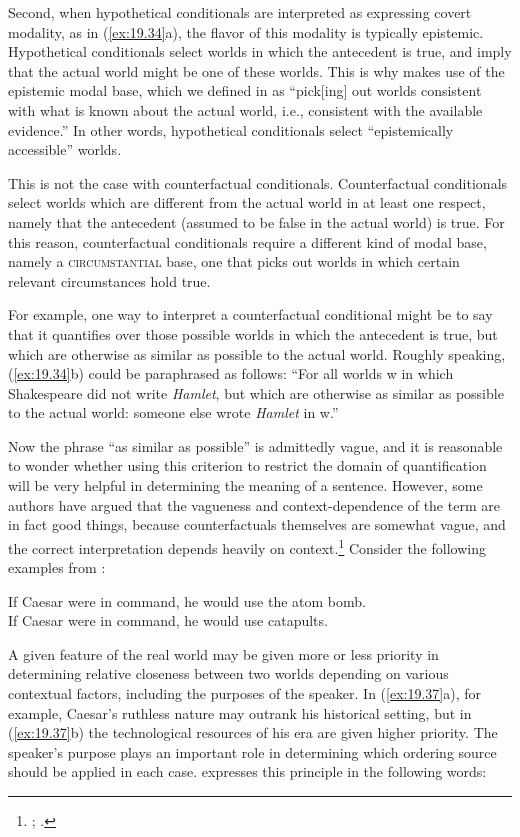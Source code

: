 Second, when hypothetical conditionals are interpreted as expressing covert modality, as in (\ref{ex:19.34}a), the flavor of this modality is typically epistemic. Hypothetical conditionals select worlds in which the antecedent is true, and imply that the actual world might be one of these worlds. This is why  makes use of the epistemic modal base, which we defined in  as “pick[ing] out worlds consistent with what is known about the actual world, i.e., consistent with the available evidence.” In other words, hypothetical conditionals select “epistemically accessible” worlds.


This is not the case with counterfactual  conditionals. Counterfactual  conditionals select worlds which are different from the actual world in at least one respect, namely that the antecedent (assumed to be false in the actual world) is true. For this reason, counterfactual  conditionals require a different kind of modal base, namely a \textsc{circumstantial} base, one that picks out worlds in which certain relevant circumstances hold true.


For example, one way to interpret a counterfactual  conditional might be to say that it quantifies over those possible worlds in which the antecedent is true, but which are otherwise as similar as possible to the actual world. Roughly speaking, (\ref{ex:19.34}b) could be paraphrased as follows: “For all worlds w in which Shakespeare did not write \textit{Hamlet}, but which are otherwise as similar as possible to the actual world: someone else wrote \textit{Hamlet} in w.”


Now the phrase “as similar as possible” is admittedly vague, and it is reasonable to wonder whether using this criterion to restrict the domain of quantification will be very helpful in determining the meaning of a sentence. However, some authors have argued that the vagueness and context-dependence of the term are in fact good things, because counterfactuals themselves are somewhat vague, and the correct interpretation depends heavily on context.\footnote{\citet[91ff]{Lewis1973a}; \citet{vonFintel2012}.} Consider the following examples from \citet[221]{Quine1960}:

\largerpage

\ea \label{ex:19.37}
\ea  If Caesar were in command, he would use the atom bomb.\\
\ex If Caesar were in command, he would use catapults.
                       \z
\z


A given feature of the real world may be given more or less priority in determining relative closeness between two worlds depending on various contextual factors, including the purposes of the speaker. In (\ref{ex:19.37}a), for example, Caesar’s ruthless nature may outrank his historical setting, but in (\ref{ex:19.37}b) the technological resources of his era are given higher priority. The speaker’s purpose plays an important role in determining which ordering source should be applied in each case. \citet[221]{Quine1960} expresses this principle in the following words:



